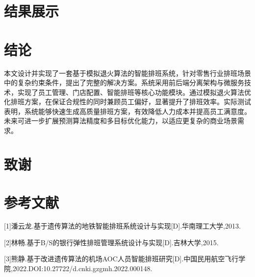 \documentclass{ctexart}
\begin{document}
\section{结果展示}

\section{结论}
本文设计并实现了一套基于模拟退火算法的智能排班系统，针对零售行业排班场景中的复杂约束条件，提出了完整的解决方案。系统采用前后端分离架构与微服务技术，实现了员工管理、门店配置、智能排班等核心功能模块。通过模拟退火算法优化排班方案，在保证合规性的同时兼顾员工偏好，显著提升了排班效率。实际测试表明，系统能够快速生成高质量排班方案，有效降低人力成本并提高员工满意度。未来可进一步扩展预测算法精度和多目标优化能力，以适应更复杂的商业场景需求。

\section*{致谢}

\section*{参考文献}
[1]潘云龙.基于遗传算法的地铁智能排班系统设计与实现[D].华南理工大学,2013.

[2]林畅.基于B/S的银行弹性排班管理系统设计与实现[D].吉林大学,2015.

[3]熊静.基于改进遗传算法的机场AOC人员智能排班研究[D].中国民用航空飞行学院,2022.DOI:10.27722/d.cnki.gzgmh.2022.000148.

\appendix
{}

\end{document}
